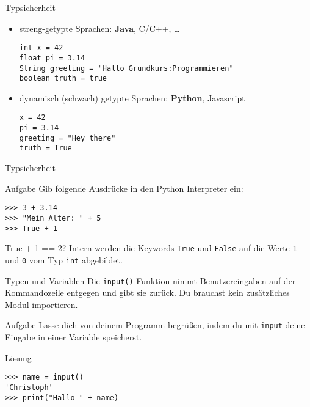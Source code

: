 \begin{frame}[fragile]{Typsicherheit}
 \begin{itemize}
    \item streng-getypte Sprachen: \textbf{Java}, C/C++, \dots
    \begin{lstlisting}
int x = 42
float pi = 3.14
String greeting = "Hallo Grundkurs:Programmieren"
boolean truth = true
    \end{lstlisting}
    \item dynamisch (schwach) getypte Sprachen: \textbf{Python}, Javascript
    \begin{lstlisting}
x = 42
pi = 3.14
greeting = "Hey there"
truth = True
    \end{lstlisting}
\end{itemize}   
\end{frame}

\begin{frame}[fragile]{Typsicherheit}
\begin{block}{Aufgabe}
Gib folgende Ausdrücke in den Python Interpreter ein:
\begin{lstlisting}
>>> 3 + 3.14
>>> "Mein Alter: " + 5
>>> True + 1
\end{lstlisting}
\end{block}
\pause{}
\begin{exampleblock}{True + 1 == 2?}
Intern werden die Keywords \lstinline{True} und \lstinline{False} auf die 
Werte \texttt{1} und \texttt{0} vom Typ \texttt{int} abgebildet.
\end{exampleblock}

\end{frame}


\begin{frame}[fragile]{Typen und Variablen}
    Die \lstinline{input()} Funktion nimmt Benutzereingaben auf der Kommandozeile 
    entgegen und gibt sie zurück. Du brauchst kein zusätzliches Modul importieren.
    \begin{block}{Aufgabe}
       Lasse dich von deinem Programm begrüßen, indem du mit \texttt{input} deine 
       Eingabe in einer Variable speicherst.
    \end{block}
    \pause{}
    \begin{exampleblock}{Lösung}
        \begin{lstlisting}
>>> name = input()
'Christoph'
>>> print("Hallo " + name)
        \end{lstlisting}
    \end{exampleblock}
\end{frame}
